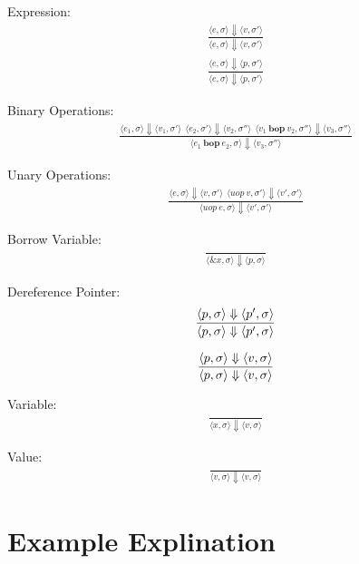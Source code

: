 \documentclass[12pt]{article}
\begin{document}
	Expression:
	\begin{align*}
		\frac{\langle e, \sigma \rangle\Downarrow \langle v, \sigma' \rangle}
		{\langle e, \sigma \rangle\Downarrow \langle v, \sigma' \rangle}
	\end{align*}
	\begin{align*}
		\frac{\langle e, \sigma \rangle\Downarrow \langle p, \sigma' \rangle}
		{\langle e, \sigma \rangle\Downarrow \langle p, \sigma' \rangle}
	\end{align*}

	Binary Operations:
	\begin{align*}
		\frac{\langle e_1, \sigma \rangle\Downarrow \langle v_1, \sigma' \rangle \ \
		\langle e_2, \sigma' \rangle\Downarrow \langle v_2, \sigma'' \rangle \ \
		\langle v_1\ \textbf{bop}\ v_2, \sigma'' \rangle\Downarrow \langle v_3, \sigma'' \rangle}
		{\langle e_1\ \textbf{bop}\ e_2, \sigma \rangle\Downarrow \langle v_3, \sigma'' \rangle}
	\end{align*}
	
	Unary Operations:
	\begin{align*}
		\frac{\langle e, \sigma \rangle\Downarrow \langle v, \sigma' \rangle \ \
		\langle uop\ v, \sigma' \rangle\Downarrow \langle v', \sigma' \rangle}
		{\langle uop\ e, \sigma \rangle\Downarrow \langle v', \sigma' \rangle}
	\end{align*}

	Borrow Variable:
	\begin{align*}
		\frac{}
		{\langle \&x, \sigma \rangle\Downarrow \langle p, \sigma \rangle}
	\end{align*}

	Dereference Pointer:
	\begin{align*}
		\frac{\langle \*p, \sigma \rangle\Downarrow \langle p', \sigma \rangle}
		{\langle \*p, \sigma \rangle\Downarrow \langle p', \sigma \rangle}
	\end{align*}

	\begin{align*}
		\frac{\langle \*p, \sigma \rangle\Downarrow \langle v, \sigma \rangle}
		{\langle \*p, \sigma \rangle\Downarrow \langle v, \sigma \rangle}
	\end{align*}	

	Variable:
	\begin{align*}
		\frac{}
		{\langle x, \sigma \rangle\Downarrow \langle v, \sigma \rangle}
	\end{align*}

	Value:
	\begin{align*}
		\frac{}
		{\langle v, \sigma \rangle\Downarrow \langle v, \sigma \rangle}
	\end{align*}

    \section{Example Explination}
	
\end{document}
